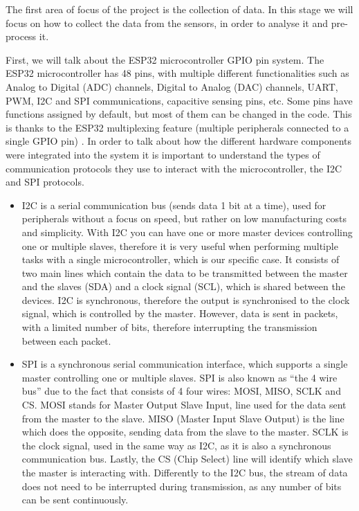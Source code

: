 \documentclass[12pt]{article}
\begin{document}
The first area of focus of the project is the collection of data. In this stage we will focus on how to collect the data from the sensors, in order to analyse it and pre-process it.\par

First, we will talk about the ESP32 microcontroller GPIO pin system. The ESP32 microcontroller has 48 pins, with multiple different functionalities such as Analog to Digital (ADC) channels, Digital to Analog (DAC) channels, UART, PWM, I2C and SPI communications, capacitive sensing pins, etc. Some pins have functions assigned by default, but most of them can be changed in the code. This is thanks to the ESP32 multiplexing feature (multiple peripherals connected to a single GPIO pin) \cite{randomnerd:gpio}. In order to talk about how the different hardware components were integrated into the system it is important to understand the types of communication protocols they use to interact with the microcontroller, the I2C and SPI protocols.

\begin{itemize}
    \item I2C is a serial communication bus (sends data 1 bit at a time), used for peripherals without a focus on speed, but rather on low manufacturing costs and simplicity. With I2C you can have one or more master devices controlling one or multiple slaves, therefore it is very useful when performing multiple tasks with a single microcontroller, which is our specific case. It consists of two main lines which contain the data to be transmitted between the master and the slaves (SDA) and a clock signal (SCL), which is shared between the devices. I2C is synchronous, therefore the output is synchronised to the clock signal, which is controlled by the master. However, data is sent in packets, with a limited number of bits, therefore interrupting the transmission between each packet.
    \item SPI is a synchronous serial communication interface, which supports a single master controlling one or multiple slaves. SPI is also known as ``the 4 wire bus'' due to the fact that consists of 4 four wires: MOSI, MISO, SCLK and CS. MOSI stands for Master Output Slave Input, line used for the data sent from the master to the slave. MISO (Master Input Slave Output) is the line which does the opposite, sending data from the slave to the master. SCLK is the clock signal, used in the same way as I2C, as it is also a synchronous communication bus. Lastly, the CS (Chip Select) line will identify which slave the master is interacting with. Differently to the I2C bus, the stream of data does not need to be interrupted during transmission, as any number of bits can be sent continuously.
\end{itemize}
\end{document}
